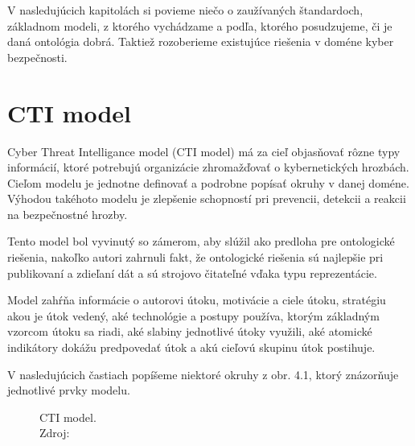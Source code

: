 \documentclass[12pt, a4paper, oneside]{book}
\begin{document}
V nasledujúcich kapitolách si povieme niečo o zaužívaných štandardoch, základnom modeli, z ktorého vychádzame a podľa, ktorého posudzujeme, či je daná ontológia dobrá. Taktiež rozoberieme existujúce riešenia v doméne kyber bezpečnosti.

\section{CTI model}
Cyber Threat Intelligance model \citep{MavroeidisB17} (CTI model) má za cieľ objasňovať rôzne typy informácií, ktoré potrebujú organizácie zhromažďovať o kybernetických hrozbách. Cieľom modelu je jednotne definovať a podrobne popísať okruhy v danej doméne. Výhodou takéhoto modelu je zlepšenie schopností pri prevencii, detekcii a reakcii na bezpečnostné hrozby.


Tento model bol vyvinutý so zámerom, aby slúžil ako predloha pre ontologické riešenia, nakoľko autori zahrnuli fakt, že ontologické riešenia sú najlepšie pri publikovaní a zdieľaní dát a sú strojovo čitateľné vďaka typu reprezentácie.


Model zahŕňa informácie o autorovi útoku, motivácie a ciele útoku, stratégiu akou je útok vedený, aké technológie a postupy používa, ktorým základným vzorcom útoku sa riadi, aké slabiny jednotlivé útoky využili, aké atomické indikátory dokážu predpovedať útok a akú cieľovú skupinu útok postihuje.


V nasledujúcich častiach popíšeme niektoré okruhy z obr. 4.1, ktorý znázorňuje jednotlivé prvky modelu.


\begin{figure}
\label{fig:semantic_web}
\caption{CTI model.\\Zdroj: \citep{MavroeidisB17}}

\end{figure}
\end{document}

